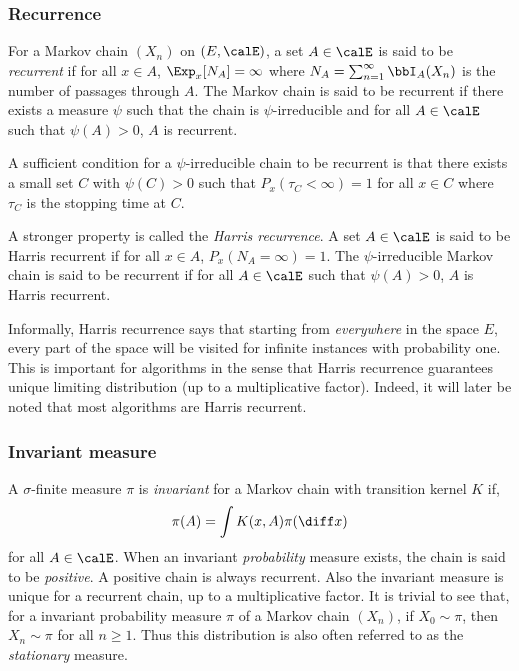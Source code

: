 \subsubsection{Recurrence}

For a Markov chain $(X_n)$ on $(E,\calE)$, a set $A\in\calE$ is said to be
\emph{recurrent} if for all $x\in A$, $\Exp_x[N_A] = \infty$ where $N_A =
\sum_{n=1}^{\infty}\bbI_A(X_n)$ is the number of passages through $A$. The
Markov chain is said to be recurrent if there exists a measure $\psi$ such
that the chain is $\psi$-irreducible and for all $A\in\calE$ such that
$\psi(A)>0$, $A$ is recurrent.

A sufficient condition for a $\psi$-irreducible chain to be recurrent is that
there exists a small set $C$ with $\psi(C)>0$ such that $P_x(\tau_C<\infty) =
1$ for all $x\in C$ where $\tau_C$ is the stopping time at $C$.

A stronger property is called the \emph{Harris recurrence}. A set $A\in\calE$
is said to be Harris recurrent if for all $x\in A$, $P_x(N_A = \infty) = 1$.
The $\psi$-irreducible Markov chain is said to be recurrent if for all
$A\in\calE$ such that $\psi(A)>0$, $A$ is Harris recurrent.

Informally, Harris recurrence says that starting from \emph{everywhere} in the
space $E$, every part of the space will be visited for infinite instances with
probability one. This is important for \mcmc algorithms in the sense that
Harris recurrence guarantees unique limiting distribution (up to a
multiplicative factor). Indeed, it will later be noted that most algorithms
are Harris recurrent.

\subsubsection{Invariant measure}

A $\sigma$-finite measure $\pi$ is \emph{invariant} for a Markov chain with
transition kernel $K$ if,
\begin{equation}
  \pi(A) = \int K(x,A)\pi(\diff x)
\end{equation}
for all $A\in\calE$. When an invariant \emph{probability} measure exists, the
chain is said to be \emph{positive}. A positive chain is always recurrent.
Also the invariant measure is unique for a recurrent chain, up to a
multiplicative factor. It is trivial to see that, for a invariant probability
measure $\pi$ of a Markov chain $(X_n)$, if $X_0\sim\pi$, then $X_n\sim\pi$
for all $n\ge1$. Thus this distribution is also often referred to as the
\emph{stationary} measure.

